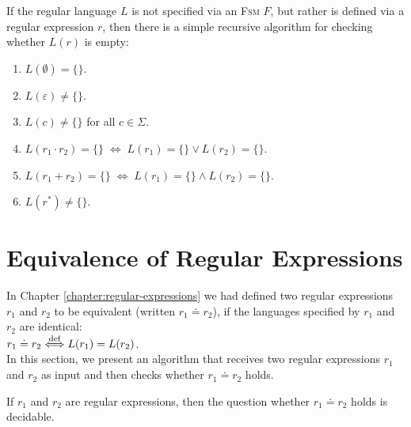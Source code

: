 \remarkEng
If the regular language  $L$ is not specified via an \textsc{Fsm} $F$, but rather is defined
via a regular expression $r$, then there is a simple recursive algorithm for checking whether 
$L(r)$ is empty:
\begin{enumerate}
\item $L(\emptyset) = \{\}$.
\item $L(\varepsilon) \not= \{\}$.
\item $L(c) \not= \{\}$ \quad for all $c \in \Sigma$.
\item $L(r_1 \cdot r_2) = \{\} \;\Leftrightarrow\; L(r_1) = \{\} \vee L(r_2) = \{\}$.
\item $L(r_1 + r_2) = \{\} \;\Leftrightarrow\; L(r_1) = \{\} \wedge L(r_2) = \{\}$.
\item $L(r^*) \not= \{\}$. \eox
\end{enumerate}


\section{Equivalence of Regular Expressions}
In Chapter \ref{chapter:regular-expressions} we had defined two regular expressions $r_1$ and $r_2$ to be equivalent 
(written $r_1 \doteq r_2$), if the languages specified by $r_1$ and $r_2$ are identical:
\\[0.2cm]
\hspace*{1.3cm}
$r_1 \doteq r_2 \stackrel{\mbox{\scriptsize def}}{\Longleftrightarrow} L(r_1) = L(r_2)$. 
\\[0.2cm]
In this section, we present an algorithm that receives two regular expressions $r_1$ and $r_2$ as input and then
checks whether $r_1 \doteq r_2$ holds. 


\begin{Theorem}
  If $r_1$ and $r_2$ are regular expressions, then the question whether $r_1 \doteq r_2$ holds is decidable.
\end{Theorem}

